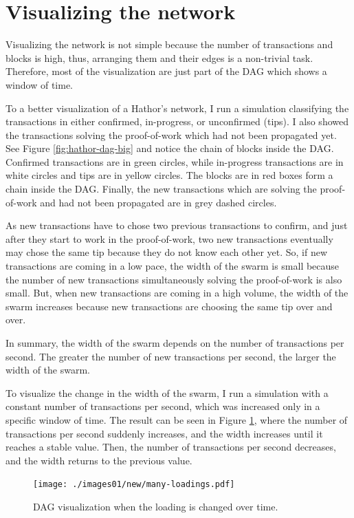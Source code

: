 \clearpage


\section{Visualizing the network}

Visualizing the network is not simple because the number of transactions and blocks is high, thus, arranging them and their edges is a non-trivial task. Therefore, most of the visualization are just part of the DAG which shows a window of time.

To a better visualization of a Hathor's network, I run a simulation classifying the transactions in either confirmed, in-progress, or unconfirmed (tips). I also showed the transactions solving the proof-of-work which had not been propagated yet. See Figure \ref{fig:hathor-dag-big} and notice the chain of blocks inside the DAG. Confirmed transactions are in green circles, while in-progress transactions are in white circles and tips are in yellow circles. The blocks are in red boxes form a chain inside the DAG. Finally, the new transactions which are solving the proof-of-work and had not been propagated are in grey dashed circles.

As new transactions have to chose two previous transactions to confirm, and just after they start to work in the proof-of-work, two new transactions eventually may chose the same tip because they do not know each other yet. So, if new transactions are coming in a low pace, the width of the swarm is small because the number of new transactions simultaneously solving the proof-of-work is also small. But, when new transactions are coming in a high volume, the width of the swarm increases because new transactions are choosing the same tip over and over.

In summary, the width of the swarm depends on the number of transactions per second. The greater the number of new transactions per second, the larger the width of the swarm.

To visualize the change in the width of the swarm, I run a simulation with a constant number of transactions per second, which was increased only in a specific window of time. The result can be seen in Figure \ref{fig:hathor-load-changing}, where the number of transactions per second suddenly increases, and the width increases until it reaches a stable value. Then, the number of transactions per second decreases, and the width returns to the previous value.

\begin{figure}[!htb]
\centering
\texttt{[image: ./images01/new/many-loadings.pdf]}

\caption{DAG visualization when the loading is changed over time. \label{fig:hathor-load-changing}}
\end{figure}






